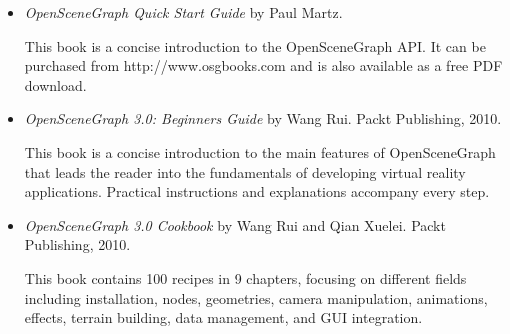 \begin{itemize}
\item \textit{OpenSceneGraph Quick Start Guide} by Paul Martz.

This book is a concise introduction to the OpenSceneGraph API. It can be
purchased from http://www.osgbooks.com and is also available as a free PDF
download.

\item \textit{OpenSceneGraph 3.0: Beginners Guide} by Wang Rui. Packt Publishing, 2010.

This book is a concise introduction to the main features of OpenSceneGraph that
leads the reader into the fundamentals of developing virtual reality
applications. Practical instructions and explanations accompany every step.

\item \textit{OpenSceneGraph 3.0 Cookbook} by Wang Rui and Qian Xuelei. Packt Publishing, 2010.

This book contains 100 recipes in 9 chapters, focusing on different fields
including installation, nodes, geometries, camera manipulation, animations,
effects, terrain building, data management, and GUI integration.

\end{itemize}


